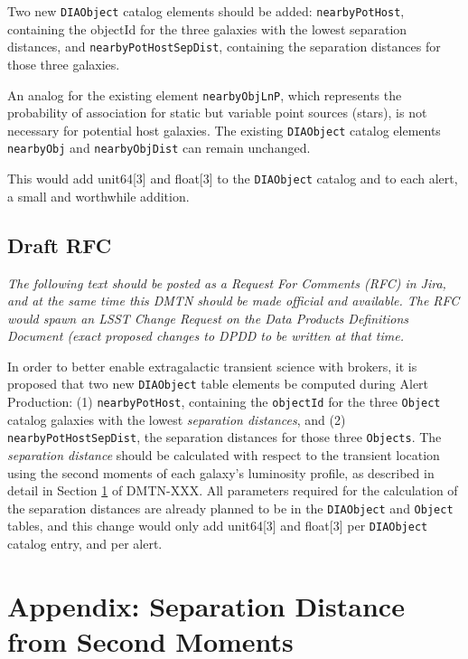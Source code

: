 \documentclass[DM,lsstdraft,authoryear,toc]{lsstdoc}
\begin{document}
Two new {\tt DIAObject} catalog elements should be added: {\tt nearbyPotHost}, containing the objectId for the three galaxies with the lowest separation distances, and {\tt nearbyPotHostSepDist}, containing the separation distances for those three galaxies.

An analog for the existing element {\tt nearbyObjLnP}, which represents the probability of association for static but variable point sources (stars), is not necessary for potential host galaxies. The existing {\tt DIAObject} catalog elements {\tt nearbyObj} and {\tt nearbyObjDist} can remain unchanged.

This would add unit64[3] and float[3] to the {\tt DIAObject} catalog and to each alert, a small and worthwhile addition.


\subsection{Draft RFC}\label{ssec:draft_rfc}

\textit{The following text should be posted as a Request For Comments (RFC) in Jira, and at the same time this DMTN should be made official and available. The RFC would spawn an LSST Change Request on the Data Products Definitions Document (exact proposed changes to DPDD to be written at that time.}

In order to better enable extragalactic transient science with brokers, it is proposed that two new {\tt DIAObject} table elements be computed during Alert Production:
(1) {\tt nearbyPotHost}, containing the {\tt objectId} for the three {\tt Object} catalog galaxies with the lowest \emph{separation distances}, and
(2) {\tt nearbyPotHostSepDist}, the separation distances for those three {\tt Objects}.
The \emph{separation distance} should be calculated with respect to the transient location using the second moments of each galaxy's luminosity profile, as described in detail in Section \ref{sec:app} of DMTN-XXX.
All parameters required for the calculation of the separation distances are already planned to be in the {\tt DIAObject} and {\tt Object} tables, and this change would only add unit64[3] and float[3] per {\tt DIAObject} catalog entry, and per alert.


\clearpage
\section{Appendix: Separation Distance from Second Moments}\label{sec:app}
\end{document}
